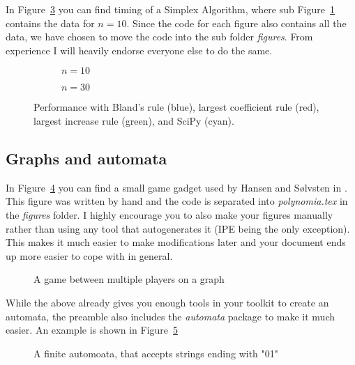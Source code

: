 \documentclass[english]{article}
\begin{document}
In Figure~\ref{fig:simplex} you can find timing of a Simplex Algorithm, where
sub Figure~\ref{fig:simplex_10} contains the data for $n = 10$. Since the code
for each figure also contains all the data, we have chosen to move the code into
the sub folder \emph{figures}. From experience I will heavily endorse everyone
else to do the same.
\begin{figure}[ht!]
  \centering
  \begin{subfigure}{.48\linewidth}
    \centering
    
    \caption{$n = 10$}
    \label{fig:simplex_10}
  \end{subfigure}
  \begin{subfigure}{.48\linewidth}
    \centering
    
    \caption{$n = 30$}
    \label{fig:simplex_30}
  \end{subfigure}

  \caption{Performance with Bland's rule (blue), largest coefficient rule (red),
    largest increase rule (green), and SciPy (cyan).}
  \label{fig:simplex}
\end{figure}

\subsection{Graphs and automata}
In Figure~\ref{fig:game} you can find a small game gadget used by Hansen and
Sølvsten in \cite{ICALP:Hansen2020}. This figure was written by hand and the code is
separated into \emph{polynomia.tex} in the \emph{figures} folder. I highly
encourage you to also make your figures manually rather than using any tool that
autogenerates it (IPE being the only exception). This makes it much easier
to make modifications later and your document ends up more easier to cope with
in general.

\begin{figure}[ht!]
  \centering
  
  \caption{A game between multiple players on a graph}
  \label{fig:game}
\end{figure}

While the above already gives you enough tools in your toolkit to create an
automata, the preamble also includes the \emph{automata} package to make it much
easier. An example is shown in Figure~\ref{fig:FA}
\begin{figure}[ht!]
  \centering
  \caption{A finite automoata, that accepts strings ending with "01"}
  \label{fig:FA}
\end{figure}
\end{document}
